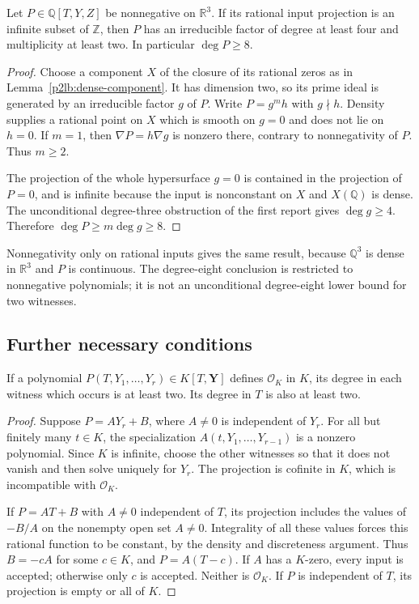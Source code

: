 \begin{theorem}\label{p2lb:nonnegative-degree-eight}
Let $P\in\mathbb Q[T,Y,Z]$ be nonnegative on $\mathbb R^3$.
If its rational input projection is an infinite subset of $\mathbb Z$,
then $P$ has an irreducible factor of degree at least four and
multiplicity at least two.  In particular $\deg P\geq8$.
\end{theorem}
\begin{proof}
Choose a component $X$ of the closure of its rational zeros as in
Lemma~\ref{p2lb:dense-component}.  It has dimension two, so its prime
ideal is generated by an irreducible factor $g$ of $P$.  Write
$P=g^m h$ with $g\nmid h$.  Density supplies a rational point on
$X$ which is smooth on $g=0$ and does not lie on $h=0$.
If $m=1$, then $\nabla P=h\nabla g$ is nonzero there, contrary
to nonnegativity of $P$.  Thus $m\geq2$.

The projection of the whole hypersurface $g=0$ is contained in
the projection of $P=0$, and is infinite because the input is
nonconstant on $X$ and $X(\mathbb Q)$ is dense.  The unconditional
degree-three obstruction of the first report gives $\deg g\geq4$.
Therefore $\deg P\geq m\deg g\geq8$.
\end{proof}

Nonnegativity only on rational inputs gives the same result, because
$\mathbb Q^3$ is dense in $\mathbb R^3$ and $P$ is continuous.
The degree-eight conclusion is restricted to nonnegative polynomials;
it is not an unconditional degree-eight lower bound for two witnesses.

\subsection{Further necessary conditions}

\begin{proposition}\label{p2lb:linear-coordinate}
If a polynomial $P(T,Y_1,\ldots,Y_r)\in K[T,\mathbf Y]$ defines
$\mathcal O_K$ in $K$, its degree in each witness which occurs is
at least two.  Its degree in $T$ is also at least two.
\end{proposition}
\begin{proof}
Suppose $P=AY_r+B$, where $A\ne0$ is independent of $Y_r$.
For all but finitely many $t\in K$, the specialization
$A(t,Y_1,\ldots,Y_{r-1})$ is a nonzero polynomial.  Since $K$ is
infinite, choose the other witnesses so that it does not vanish and
then solve uniquely for $Y_r$.  The projection is cofinite in $K$,
which is incompatible with $\mathcal O_K$.

If $P=AT+B$ with $A\ne0$ independent of $T$, its projection includes
the values of $-B/A$ on the nonempty open set $A\ne0$.  Integrality
of all these values forces this rational function to be constant,
by the density and discreteness argument.  Thus $B=-cA$ for some
$c\in K$, and $P=A(T-c)$.  If $A$ has a $K$-zero, every input is
accepted; otherwise only $c$ is accepted.  Neither is $\mathcal O_K$.
If $P$ is independent of $T$, its projection is empty or all of $K$.
\end{proof}

